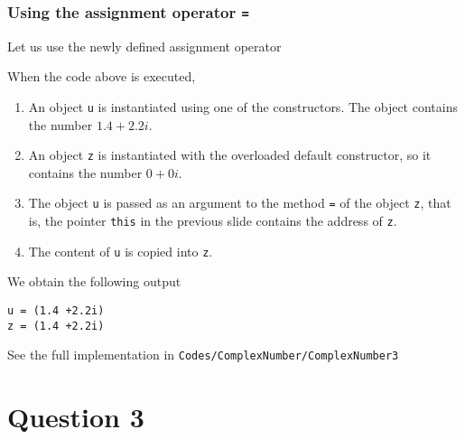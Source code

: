 \documentclass[8pt, compress]{beamer}
\def\inline{\lstinline[basicstyle=\ttfamily,keywordstyle={},directivestyle={}]}
\begin{document}
\begin{frame}[fragile]
  \frametitle{Using the assignment operator \inline|=|}

  Let us use the newly defined assignment operator
   
  When the code above is executed, 
  \begin{enumerate}
    \item An object \inline|u| is instantiated using one of the constructors. The
      object contains the number $1.4 + 2.2 i$.
    \item An object \inline|z| is instantiated with the overloaded default
      constructor, so it contains the number $0 + 0i$.
    \item The object \inline|u| is passed as an argument to the method
      \inline|=| of the object \inline|z|, that is, the pointer \inline|this| in
      the previous slide contains the address of \inline|z|.
    \item The content of \inline|u| is copied into \inline|z|.
  \end{enumerate}

  We obtain the following output
  \begin{lstlisting}[numbers=none]
u = (1.4 +2.2i)
z = (1.4 +2.2i)
  \end{lstlisting}

  See the full implementation in \inline|Codes/ComplexNumber/ComplexNumber3|
\end{frame}

\section{Question 3}
\end{document}
